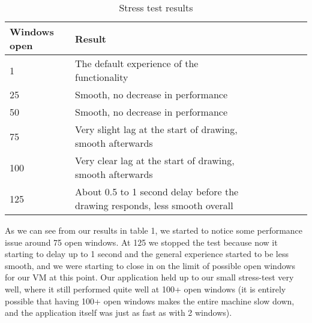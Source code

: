\begin{table}[h]
\centering
\begin{tabular}{llrrrrrr}
  Windows open & Result
  \\ \hline \hline
1 & The default experience of the functionality \\ \hline 
25 & Smooth, no decrease in performance \\   
50 & Smooth, no decrease in performance \\
75 & Very slight lag at the start of drawing, smooth afterwards\\  
100 & Very clear lag at the start of drawing, smooth afterwards\\
125 & About 0.5 to 1 second delay before the drawing responds, less smooth overall\\  
\hline \hline
\end{tabular}
\caption{Stress test results}
\label{tab:results}
\end{table}

As we can see from our results in table 1, we started to notice some performance issue around 75 open windows. At 125 we stopped the test because now it starting to delay up to 1 second and the general experience started to be less smooth, and we were starting to close in on the limit of possible open windows for our VM at this point. Our application held up to our small stress-test very well, where it still performed quite well at 100+ open windows (it is entirely possible that having 100+ open windows makes the entire machine slow down, and the application itself was just as fast as with 2 windows). 
